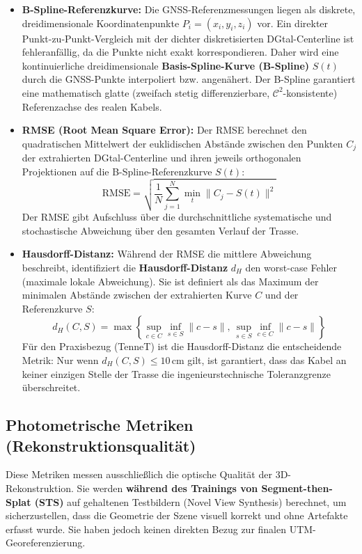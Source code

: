 \documentclass[12pt,a4paper]{article}
\begin{document}
\begin{itemize}
    \item \textbf{B-Spline-Referenzkurve:} 
          Die GNSS-Referenzmessungen liegen als diskrete, dreidimensionale Koordinatenpunkte $P_i = (x_i, y_i, z_i)$ vor. Ein direkter Punkt-zu-Punkt-Vergleich mit der dichter diskretisierten DGtal-Centerline ist fehleranfällig, da die Punkte nicht exakt korrespondieren. Daher wird eine kontinuierliche dreidimensionale \textbf{Basis-Spline-Kurve (B-Spline)} $S(t)$ durch die GNSS-Punkte interpoliert bzw. angenähert. Der B-Spline garantiert eine mathematisch glatte (zweifach stetig differenzierbare, $\mathcal{C}^2$-konsistente) Referenzachse des realen Kabels.
          
    \item \textbf{RMSE (Root Mean Square Error):} 
          Der RMSE berechnet den quadratischen Mittelwert der euklidischen Abstände zwischen den Punkten $C_j$ der extrahierten DGtal-Centerline und ihren jeweils orthogonalen Projektionen auf die B-Spline-Referenzkurve $S(t)$:
          \[
          \text{RMSE} = \sqrt{\frac{1}{N} \sum_{j=1}^{N} \min_{t} \| C_j - S(t) \|^2}
          \]
          Der RMSE gibt Aufschluss über die durchschnittliche systematische und stochastische Abweichung über den gesamten Verlauf der Trasse.

    \item \textbf{Hausdorff-Distanz:} 
          Während der RMSE die mittlere Abweichung beschreibt, identifiziert die \textbf{Hausdorff-Distanz} $d_H$ den worst-case Fehler (maximale lokale Abweichung). Sie ist definiert als das Maximum der minimalen Abstände zwischen der extrahierten Kurve $C$ und der Referenzkurve $S$:
          \[
          d_H(C, S) = \max \left\{ \sup_{c \in C} \inf_{s \in S} \| c - s \|, \, \sup_{s \in S} \inf_{c \in C} \| c - s \| \right\}
          \]
          Für den Praxisbezug (TenneT) ist die Hausdorff-Distanz die entscheidende Metrik: Nur wenn $d_H(C, S) \le 10\,\text{cm}$ gilt, ist garantiert, dass das Kabel an keiner einzigen Stelle der Trasse die ingenieurstechnische Toleranzgrenze überschreitet.
\end{itemize}

\subsection{Photometrische Metriken (Rekonstruktionsqualität)}
Diese Metriken messen ausschließlich die optische Qualität der 3D-Rekonstruktion. Sie werden \textbf{während des Trainings von Segment-then-Splat (STS)} auf gehaltenen Testbildern (Novel View Synthesis) berechnet, um sicherzustellen, dass die Geometrie der Szene visuell korrekt und ohne Artefakte erfasst wurde. Sie haben jedoch keinen direkten Bezug zur finalen UTM-Georeferenzierung.
\end{document}
